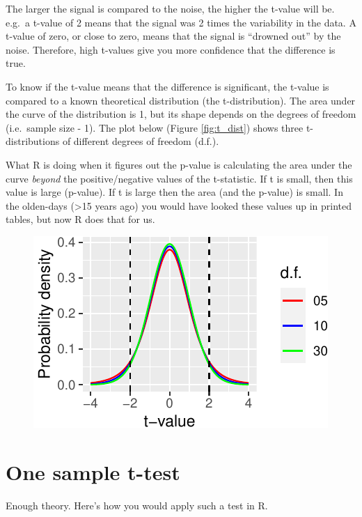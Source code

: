 \documentclass[
  a4paperpaper,
]{book}
\begin{document}
The larger the signal is compared to the noise, the higher the t-value will be. e.g.~a t-value of 2 means that the signal was 2 times the variability in the data. A t-value of zero, or close to zero, means that the signal is ``drowned out'' by the noise. Therefore, high t-values give you more confidence that the difference is true.

To know if the t-value means that the difference is significant, the t-value is compared to a known theoretical distribution (the t-distribution). The area under the curve of the distribution is 1, but its shape depends on the degrees of freedom (i.e.~sample size - 1). The plot below (Figure \ref{fig:t_dist}) shows three t-distributions of different degrees of freedom (d.f.).

What R is doing when it figures out the p-value is calculating the area under the curve \emph{beyond} the positive/negative values of the t-statistic. If t is small, then this value is large (p-value). If t is large then the area (and the p-value) is small. In the olden-days (\textgreater15 years ago) you would have looked these values up in printed tables, but now R does that for us.

\begin{figure}

{\centering \includegraphics{BB852_files/figure-latex/t_dist-1} 

}

\end{figure}

\hypertarget{one-sample-t-test}{%
\section{One sample t-test}\label{one-sample-t-test}}

Enough theory. Here's how you would apply such a test in R.
\end{document}
